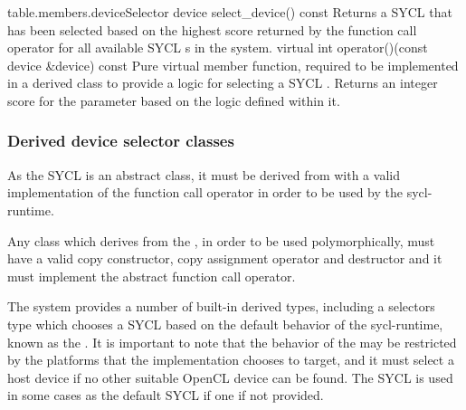 {table.members.deviceSelector}
\addRow
{device select_device() const}
{
  Returns a SYCL  that has been selected based on the highest score returned by the function call operator for all available SYCL s in the system.
}
\addRow
{virtual int operator()(const device \&device) const}
{
  Pure virtual member function, required to be implemented in a derived class to provide a logic for selecting a SYCL .
  Returns an integer score for the  parameter based on the logic defined within it.
}
\completeTable

\subsubsection{Derived device selector classes}

As the SYCL  is an abstract class, it must be derived from with a valid implementation of the function call operator in order to be used by the \gls{sycl-runtime}.

Any class which derives from the , in order to
be used polymorphically, must have a valid copy constructor,
copy assignment operator and destructor and it must implement the
abstract function call operator.

The system provides a number of built-in derived  types, including a selectors type which chooses a SYCL  based on the default behavior of the \gls{sycl-runtime}, known as the . It is important to note that the behavior of the  may be restricted by the platforms that the implementation chooses to target, and it must select a host device if no other suitable OpenCL device can be found. The SYCL  is used in some cases as the default SYCL  if one if not provided.

